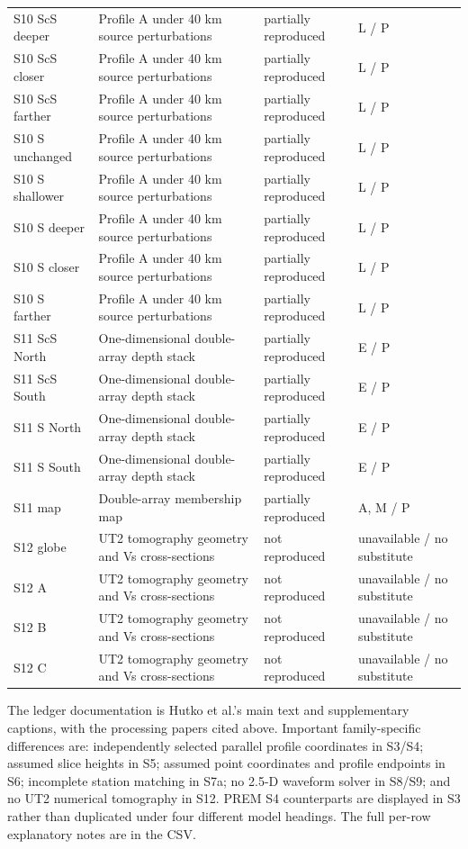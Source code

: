 \documentclass[10pt]{article}
\begin{document}
\begin{longtable}{p{.23\linewidth}p{.25\linewidth}p{.19\linewidth}p{.22\linewidth}}
S10 ScS deeper & Profile A under 40 km source perturbations & partially reproduced & L / P \\
S10 ScS closer & Profile A under 40 km source perturbations & partially reproduced & L / P \\
S10 ScS farther & Profile A under 40 km source perturbations & partially reproduced & L / P \\
S10 S unchanged & Profile A under 40 km source perturbations & partially reproduced & L / P \\
S10 S shallower & Profile A under 40 km source perturbations & partially reproduced & L / P \\
S10 S deeper & Profile A under 40 km source perturbations & partially reproduced & L / P \\
S10 S closer & Profile A under 40 km source perturbations & partially reproduced & L / P \\
S10 S farther & Profile A under 40 km source perturbations & partially reproduced & L / P \\
S11 ScS North & One-dimensional double-array depth stack & partially reproduced & E / P \\
S11 ScS South & One-dimensional double-array depth stack & partially reproduced & E / P \\
S11 S North & One-dimensional double-array depth stack & partially reproduced & E / P \\
S11 S South & One-dimensional double-array depth stack & partially reproduced & E / P \\
S11 map & Double-array membership map & partially reproduced & A, M / P \\
S12 globe & UT2 tomography geometry and Vs cross-sections & not reproduced & unavailable / no substitute \\
S12 A & UT2 tomography geometry and Vs cross-sections & not reproduced & unavailable / no substitute \\
S12 B & UT2 tomography geometry and Vs cross-sections & not reproduced & unavailable / no substitute \\
S12 C & UT2 tomography geometry and Vs cross-sections & not reproduced & unavailable / no substitute \\
\bottomrule\end{longtable}\normalsize
The ledger documentation is Hutko et al.'s main text and supplementary captions,
with the processing papers cited above. Important family-specific differences
are: independently selected parallel profile coordinates in S3/S4; assumed slice
heights in S5; assumed point coordinates and profile endpoints in S6; incomplete station
matching in S7a; no 2.5-D waveform solver in S8/S9; and no UT2 numerical tomography
in S12. PREM S4 counterparts are displayed in S3 rather than duplicated under
four different model headings. The full per-row explanatory notes are in the CSV.
\end{document}
